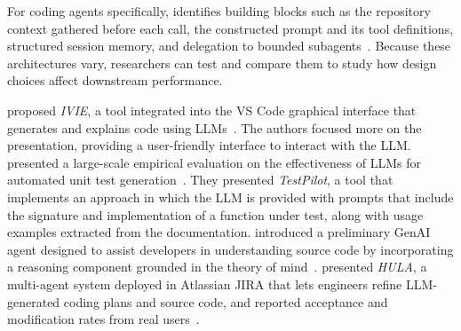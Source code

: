 For coding agents specifically, \citeauthor{raschka2026components} identifies building blocks such as the repository context gathered before each call, the constructed prompt and its tool definitions, structured session memory, and delegation to bounded subagents~\cite{raschka2026components}.
Because these architectures vary, researchers can test and compare them to study how design choices affect downstream performance.


\citeauthor{DBLP:conf/chi/YanHWH24} proposed \emph{IVIE}, a tool integrated into the VS Code graphical interface that generates and explains code using LLMs~\cite{DBLP:conf/chi/YanHWH24}.
The authors focused more on the presentation, providing a user-friendly interface to interact with the LLM. 
\citeauthor{DBLP:journals/tse/SchaferNET24} presented a large-scale empirical evaluation on the effectiveness of LLMs for automated unit test generation~\cite{DBLP:journals/tse/SchaferNET24}.
They presented \emph{TestPilot}, a tool that implements an approach in which the LLM is provided with prompts that include the signature and implementation of a function under test, along with usage examples extracted from the documentation.
\citeauthor{DBLP:conf/icsm/RichardsW24} introduced a preliminary GenAI agent designed to assist developers in understanding source code by incorporating a reasoning component grounded in the theory of mind~\cite{DBLP:conf/icsm/RichardsW24}.
\citeauthor{DBLP:conf/icse-seip/TakerngsaksiriPTTZJLCCW25} presented \emph{HULA}, a multi-agent system deployed in Atlassian JIRA that lets engineers refine LLM-generated coding plans and source code, and reported acceptance and modification rates from real users~\cite{DBLP:conf/icse-seip/TakerngsaksiriPTTZJLCCW25}.
